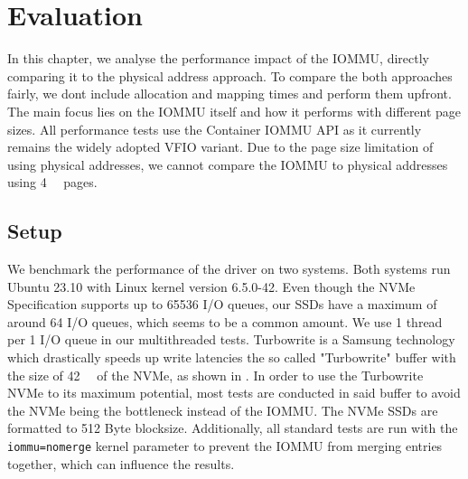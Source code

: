 \chapter{Evaluation}
In this chapter, we analyse the performance impact of the IOMMU, directly comparing it to the physical address approach. To compare the both approaches fairly, we dont include allocation and mapping times and perform them upfront. The main focus lies on the IOMMU itself and how it performs with different page sizes. All performance tests use the Container IOMMU API as it currently remains the widely adopted VFIO variant.
Due to the page size limitation of using physical addresses, we cannot compare the IOMMU to physical addresses using \qty{4}{\kibi\byte} pages.

\section{Setup}
We benchmark the performance of the driver on two systems.
Both systems run Ubuntu 23.10 with Linux kernel version 6.5.0-42.
Even though the NVMe Specification supports up to 65536 I/O queues, our SSDs have a maximum of around 64 I/O queues, which seems to be a common amount. We use 1 thread per 1 I/O queue in our multithreaded tests. Turbowrite is a Samsung technology which drastically speeds up write latencies the so called "Turbowrite" buffer with the size of \qty{42}{\giga\byte} of the NVMe, as shown in \cite{vroom}. In order to use the Turbowrite NVMe to its maximum potential, most tests are conducted in said buffer to avoid the NVMe being the bottleneck instead of the IOMMU.
The NVMe SSDs are formatted to 512 Byte blocksize.
Additionally, all standard tests are run with the \texttt{iommu=nomerge} kernel parameter to prevent the IOMMU from merging entries together, which can influence the results.

